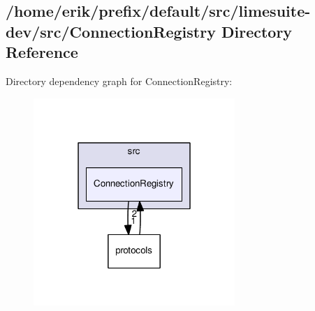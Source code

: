 \subsection{/home/erik/prefix/default/src/limesuite-\/dev/src/\+Connection\+Registry Directory Reference}
\label{dir_e17dcc4406c636f4e826c10e177f8ed7}
Directory dependency graph for Connection\+Registry\+:
\nopagebreak
\begin{figure}[H]
\begin{center}
\leavevmode
\includegraphics[width=216pt]{dir_e17dcc4406c636f4e826c10e177f8ed7_dep}
\end{center}
\end{figure}
